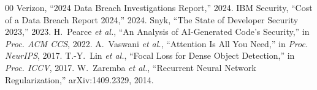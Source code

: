 \documentclass[conference,compsoc]{IEEEtran}
\begin{document}
\begin{thebibliography}{00}
 Verizon, ``2024 Data Breach Investigations Report,'' 2024.
 IBM Security, ``Cost of a Data Breach Report 2024,'' 2024.
 Snyk, ``The State of Developer Security 2023,'' 2023.
 H.~Pearce \textit{et al.}, ``An Analysis of AI-Generated Code's Security,'' in \textit{Proc. ACM CCS}, 2022.
 A.~Vaswani \textit{et al.}, ``Attention Is All You Need,'' in \textit{Proc. NeurIPS}, 2017.
 T.-Y.~Lin \textit{et al.}, ``Focal Loss for Dense Object Detection,'' in \textit{Proc. ICCV}, 2017.
 W.~Zaremba \textit{et al.}, ``Recurrent Neural Network Regularization,'' arXiv:1409.2329, 2014.
\end{thebibliography}
\end{document}
